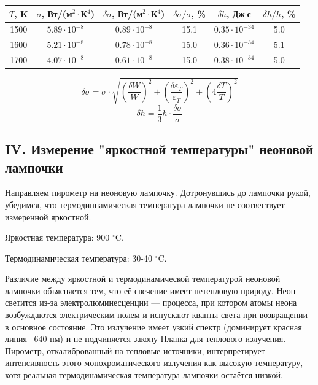 \documentclass[a4paper,12pt]{article}
\begin{document}
\begin{enumerate}
    \begin{table}[h!]
    \centering
    \begin{tabular}{||c|c|c|c|c|c||}
    \hline
    $T$, K & $\sigma$, Вт/(м$^2\cdot$К$^4$) & $\delta\sigma$, Вт/(м$^2\cdot$К$^4$) & $\delta\sigma/\sigma$, \% & $\delta h$, Дж$\cdot$с & $\delta h/h$, \% \\
    \hline
    1500 & $5.89 \cdot 10^{-8}$ & $0.89 \cdot 10^{-8}$ & 15.1 & $0.35 \cdot 10^{-34}$ & 5.0 \\
    1600 & $5.21 \cdot 10^{-8}$ & $0.78 \cdot 10^{-8}$ & 15.0 & $0.36 \cdot 10^{-34}$ & 5.1 \\
    1700 & $4.07 \cdot 10^{-8}$ & $0.61 \cdot 10^{-8}$ & 15.0 & $0.38 \cdot 10^{-34}$ & 5.0 \\
    \hline
    \end{tabular}
    \end{table}
    
    $$
    \delta\sigma = \sigma \cdot \sqrt{\left(\frac{\delta W}{W}\right)^2 + \left(\frac{\delta\varepsilon_T}{\varepsilon_T}\right)^2 + \left(4\frac{\delta T}{T}\right)^2}
    $$
    $$
    \delta h = \frac{1}{3}h \cdot \frac{\delta\sigma}{\sigma}
    $$

    
\end{enumerate}

\subsection{IV. Измерение "яркостной температуры" неоновой лампочки}

Направляем пирометр на неоновую лампочку. Дотронувшись до лампочки рукой, убедимся, что термодиннамическая температура лампочки не соотвествует измеренной яркостной.

Яркостная температура: 900 $^\circ$C.

Термодинамическая температура: 30-40 $^\circ$C.

Различие между яркостной и термодинамической температурой неоновой лампочки объясняется тем, что её свечение имеет нетепловую природу. Неон светится из-за электролюминесценции — процесса, при котором атомы неона возбуждаются электрическим полем и испускают кванты света при возвращении в основное состояние. Это излучение имеет узкий спектр (доминирует красная линия ~640 нм) и не подчиняется закону Планка для теплового излучения. Пирометр, откалиброванный на тепловые источники, интерпретирует интенсивность этого монохроматического излучения как высокую температуру, хотя реальная термодинамическая температура лампочки остаётся низкой.
\end{document}
